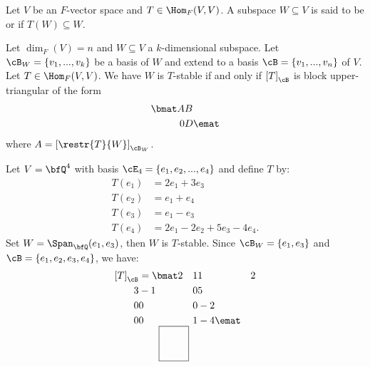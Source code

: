    \begin{definition}
        Let $V$ be an $F$-vector space and $T \in \Hom_F{(V,V)}$. A subspace $W \subseteq V$ is said to be  or  if $T(W) \subseteq W$.
    \end{definition}

    \begin{theorem}\label{thm:stable-block-diagonal}
        Let $\dim_F{(V)} = n$ and $W \subseteq V$ a $k$-dimensional subspace. Let $\cB_W = \{v_1,...,v_k\}$ be a basis of $W$ and extend to a basis $\cB = \{v_1,...,v_n\}$ of $V$. Let $T \in \Hom_F{(V,V)}$. We have $W$ is $T$-stable if and only if $\left[T\right]_\cB$ is block upper-triangular of the form
            \begin{equation*}
            \begin{split}
                \bmat A & B \\ 0& D \emat
            \end{split}
            \end{equation*}
        where $A = \left[\restr{T}{W}\right]_{\cB_W}$.
    \end{theorem}

    \begin{example}
        Let $V = \bfQ^4$ with basis $\cE_4 = \{e_1,e_2,...,e_4\}$ and define $T$ by:
            \begin{equation*}
            \begin{split}
                T(e_1) &= 2e_1 + 3e_3 \\
                T(e_2) &= e_1 + e_4 \\
                T(e_3) &= e_1 - e_3 \\
                T(e_4) &= 2e_1 - 2e_2 + 5e_3 - 4e_4.
            \end{split}
            \end{equation*}
        Set $W = \Span_\bfQ(e_1,e_3)$, then $W$ is $T$-stable. Since $\cB_W = \{e_1,e_3\}$ and $\cB = \{e_1,e_2,e_3,e_4\}$, we have:
            \begin{equation*}
            \begin{split}
                \left[T\right]_\cB
                &= \bmat 2 & 1 & 1 & 2 \\ 3 & -1 & 0 & 5 \\ 0 & 0 & 0 & -2 \\ 0 & 0 & 1 & -4 \emat
                \begin{tikzpicture}[overlay, remember picture]
                    \draw[gray, thick] (-1.85,-1.32) rectangle (-2.9,-0.1); %
                \end{tikzpicture}
            \end{split}
            \end{equation*}
    \end{example}

